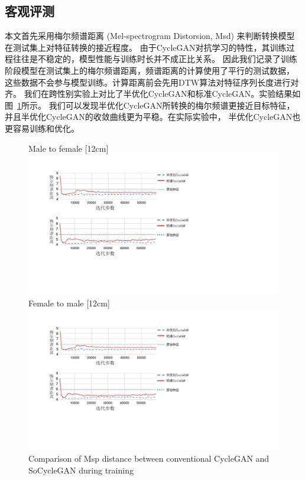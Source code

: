 \subsection{客观评测}
本文首先采用梅尔频谱距离 (Mel-spectrogram Distorsion, Msd) 来判断转换模型在测试集上对特征转换的接近程度。
由于CycleGAN对抗学习的特性，其训练过程往往是不稳定的，模型性能与训练时长并不成正比关系。
因此我们记录了训练阶段模型在测试集上的梅尔频谱距离，频谱距离的计算使用了平行的测试数据，
这些数据不会参与模型训练。计算距离前会先用DTW算法对特征序列长度进行对齐。
我们在跨性别实验上对比了半优化CycleGAN和标准CycleGAN。实验结果如图~\ref{fig:msd}所示。
我们可以发现半优化CycleGAN所转换的梅尔频谱更接近目标特征，并且半优化CycleGAN的收敛曲线更为平稳。在实际实验中，
半优化CycleGAN也更容易训练和优化。

\begin{figure}[!hbtp]
    \centering
                    {Male to female}%
                    [12cm]{\includegraphics[width=12cm,trim=50 320 350 60,clip]{figure/4_msd.png}} \\
    \vspace{0.5cm}
                    {Female to male}%
                    [12cm]{\includegraphics[width=12cm,trim=50 150 350 240,clip]{figure/4_msd.png}}
              {Comparison of Msp distance between conventional CycleGAN and SoCycleGAN during training}
    \label{fig:msd}
  \end{figure}

